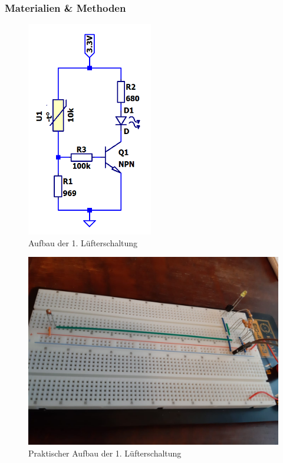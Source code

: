 
\clearpage
\subsubsection{Materialien \& Methoden}

\begin{figure}[htb]
    \includegraphics[width=5.5cm]{./res/Luefter_1_Spice}
    \caption{Aufbau der 1. Lüfterschaltung}
    \label{fig:Lüfterschaltung1}
\end{figure}

\begin{figure}[htb]
    \includegraphics[width=12cm]{./res/Luefter_1_Aufbau}
    \caption{Praktischer Aufbau der 1. Lüfterschaltung}
    \label{fig:Lüfterschaltung1Praktisch}
\end{figure}

